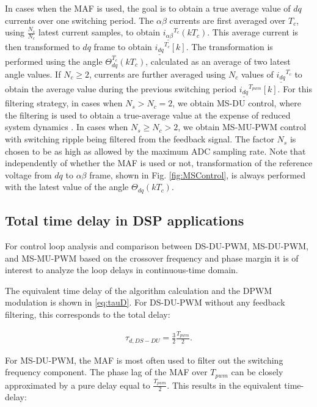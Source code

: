 \documentclass[conference]{IEEEtran}
\begin{document}
In cases when the MAF is used, the goal is to obtain a true average value of $dq$ currents over one switching period. The $\alpha \beta$ currents are first averaged over $T_c$, using $\frac{N_s}{N_c}$ latest current samples, to obtain $\underline{i_{\alpha \beta}}^{T_c} (kT_c)$. This average current is then transformed to $dq$ frame to obtain $\underline{i_{dq}}^{T_c} [k]$. The transformation is performed using the angle $\Theta_{dq}^{T_c}(kT_c)$, calculated as an average of two latest angle values. If $N_c\geq 2$, currents are further averaged using $N_c$ values of $\underline{i_{dq}}^{T_c}$ to obtain the average value during the previous switching period $\underline{i_{dq}}^{T_{pwm}}[k]$.
For this filtering strategy, in cases when $N_s>N_c = 2$, we obtain MS-DU control, where the filtering is used to obtain a true-average value at the expense of reduced system dynamics \cite{vuksa2016}. In cases when $N_s \geq N_c > 2$, we obtain MS-MU-PWM control with switching ripple being filtered from the feedback signal. The factor $N_s$ is chosen to be as high as allowed by the maximum ADC sampling rate.
Note that independently of whether the MAF is used or not, transformation of the reference voltage from $dq$ to $\alpha \beta$ frame, shown in Fig. \ref{fig:MSControl}, is always performed with the latest value of the angle $\Theta_{dq}(kT_c)$.

\subsection{Total time delay in DSP applications}

For control loop analysis and comparison between DS-DU-PWM, MS-DU-PWM, and MS-MU-PWM based on the crossover frequency and phase margin it is of interest to analyze the loop delays in continuous-time domain.

The equivalent time delay of the algorithm calculation and the DPWM modulation is shown in \eqref{eq:tauD}. For DS-DU-PWM without any feedback filtering, this corresponds to the total delay:

\begin{equation}
\begin{aligned}
\tau_{d,DS-DU} = \frac{3}{2} \frac{T_{pwm}}{2}.
\label{eq:tauDSDU} 
\end{aligned}    
\end{equation}

For MS-DU-PWM, the MAF is most often used to filter out the switching frequency component. The phase lag of the MAF over $T_{pwm}$ can be closely approximated by a pure delay equal to $\frac{T_{pwm}}{2}$. This results in the equivalent time-delay:
\end{document}
